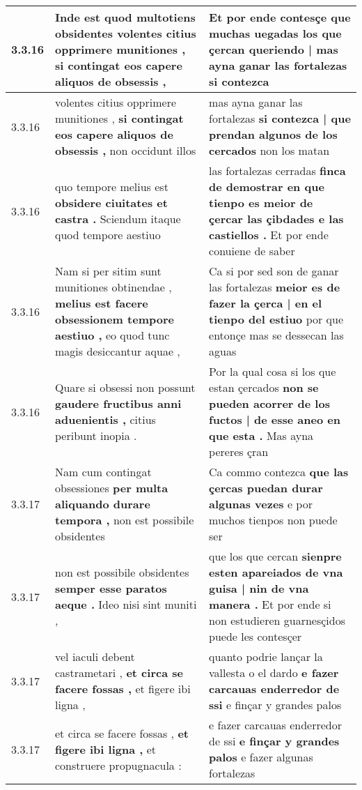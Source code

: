 \begin{tabular}{|p{1cm}|p{6.5cm}|p{6.5cm}|}
3.3.16 & Inde est quod multotiens obsidentes \textbf{ volentes citius opprimere munitiones , } si contingat eos capere aliquos de obsessis , & Et por ende contesçe que muchas uegadas \textbf{ los que çercan queriendo | mas ayna ganar las fortalezas } si contezca \\\hline
3.3.16 & volentes citius opprimere munitiones , \textbf{ si contingat eos capere aliquos de obsessis , } non occidunt illos & mas ayna ganar las fortalezas \textbf{ si contezca | que prendan algunos de los cercados } non los matan \\\hline
3.3.16 & quo tempore melius est \textbf{ obsidere ciuitates et castra . } Sciendum itaque quod tempore aestiuo & las fortalezas cerradas \textbf{ finca de demostrar en que tienpo es meior de çercar las çibdades e las castiellos . } Et por ende conuiene de saber \\\hline
3.3.16 & Nam si per sitim sunt munitiones obtinendae , \textbf{ melius est facere obsessionem tempore aestiuo , } eo quod tunc magis desiccantur aquae , & Ca si por sed son de ganar las fortalezas \textbf{ meior es de fazer la çerca | en el tienpo del estiuo } por que entonçe mas se dessecan las aguas \\\hline
3.3.16 & Quare si obsessi non possunt \textbf{ gaudere fructibus anni aduenientis , } citius peribunt inopia . & Por la qual cosa si los que estan çercados \textbf{ non se pueden acorrer de los fuctos | de esse aneo en que esta . } Mas ayna pereres çran \\\hline
3.3.17 & Nam cum contingat obsessiones \textbf{ per multa aliquando durare tempora , } non est possibile obsidentes & Ca commo contezca \textbf{ que las çercas puedan durar algunas vezes } e por muchos tienpos non puede ser \\\hline
3.3.17 & non est possibile obsidentes \textbf{ semper esse paratos aeque . } Ideo nisi sint muniti , & que los que cercan \textbf{ sienpre esten apareiados de vna guisa | nin de vna manera . } Et por ende si non estudieren guarnesçidos puede les contesçer \\\hline
3.3.17 & vel iaculi debent castrametari , \textbf{ et circa se facere fossas , } et figere ibi ligna , & quanto podrie lançar la vallesta o el dardo \textbf{ e fazer carcauas enderredor de ssi } e finçar y grandes palos \\\hline
3.3.17 & et circa se facere fossas , \textbf{ et figere ibi ligna , } et construere propugnacula : & e fazer carcauas enderredor de ssi \textbf{ e finçar y grandes palos } e fazer algunas fortalezas \\\hline

\end{tabular}
